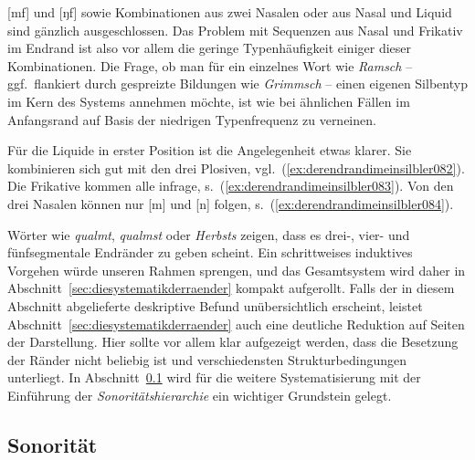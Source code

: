 [mf] und [ŋf] sowie Kombinationen aus zwei Nasalen oder aus Nasal und Liquid sind gänzlich ausgeschlossen.
Das Problem mit Sequenzen aus Nasal und Frikativ im Endrand ist also vor allem die geringe Typenhäufigkeit einiger dieser Kombinationen.
Die Frage, ob man \zB für ein einzelnes Wort wie \textit{Ramsch} -- ggf.\ flankiert durch gespreizte Bildungen wie \textit{Grimmsch} -- einen eigenen Silbentyp im Kern des Systems annehmen möchte, ist wie bei ähnlichen Fällen im Anfangsrand auf Basis der niedrigen Typenfrequenz zu verneinen.

Für die Liquide in erster Position ist die Angelegenheit etwas klarer.
Sie kombinieren sich gut mit den drei Plosiven, vgl.\ (\ref{ex:derendrandimeinsilbler082}).
Die Frikative kommen alle infrage, s.\ (\ref{ex:derendrandimeinsilbler083}).
Von den drei Nasalen können nur [m] und [n] folgen, s.\ (\ref{ex:derendrandimeinsilbler084}).

\begin{exe}
  \ex\label{ex:derendrandimeinsilbler081}
  \begin{xlist}
  \end{xlist}
\end{exe}

Wörter wie \textit{qualmt}, \textit{qualmst} oder \textit{Herbsts} zeigen, dass es drei-, vier- und fünfsegmentale Endränder zu geben scheint.
Ein schrittweises induktives Vorgehen würde unseren Rahmen sprengen, und das Gesamtsystem wird daher in Abschnitt~\ref{sec:diesystematikderraender} kompakt aufgerollt.
Falls der in diesem Abschnitt abgelieferte deskriptive Befund unübersichtlich erscheint, leistet Abschnitt~\ref{sec:diesystematikderraender} auch eine deutliche Reduktion auf Seiten der Darstellung.
Hier sollte vor allem klar aufgezeigt werden, dass die Besetzung der Ränder nicht beliebig ist und verschiedensten Strukturbedingungen unterliegt.
In Abschnitt~\ref{sec:sonoritaet} wird für die weitere Systematisierung mit der Einführung der \textit{Sonoritätshierarchie} ein wichtiger Grundstein gelegt.

\subsection{Sonorität}
\label{sec:sonoritaet}

